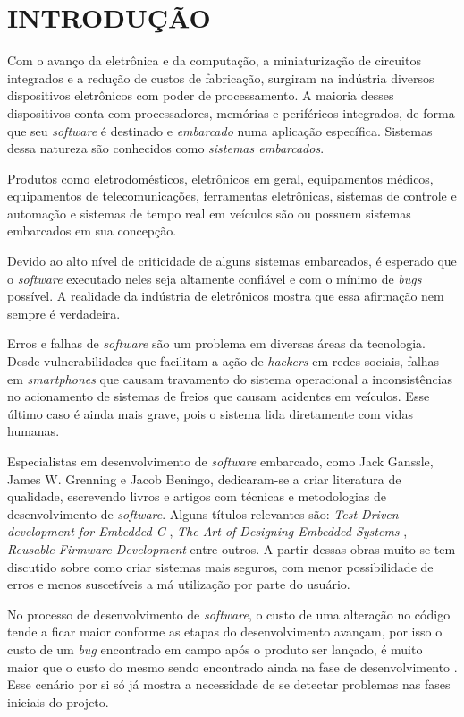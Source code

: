 \documentclass[times, twoside, watermark]{artigo}
\begin{document}
\section{INTRODUÇÃO}
Com o avanço da eletrônica e da computação, a miniaturização de circuitos integrados e a redução de custos de fabricação, 
surgiram na indústria diversos dispositivos eletrônicos com poder de processamento. 
A maioria desses dispositivos conta com processadores, memórias e periféricos integrados, 
de forma que seu \textit{software} é destinado e \textit{embarcado} numa aplicação específica. 
Sistemas dessa natureza são conhecidos como \textit{sistemas embarcados}.

Produtos como eletrodomésticos, eletrônicos em geral, equipamentos médicos, equipamentos de telecomunicações, 
ferramentas eletrônicas, sistemas de controle e automação e sistemas de tempo real em veículos são ou 
possuem sistemas embarcados em sua concepção.

Devido ao alto nível de criticidade de alguns sistemas embarcados, é esperado que o \textit{software} executado 
neles seja altamente confiável e com o mínimo de \textit{bugs} possível. A realidade da indústria de eletrônicos 
mostra que essa afirmação nem sempre é verdadeira.

Erros e falhas de \textit{software} são um problema em diversas áreas da tecnologia. 
Desde vulnerabilidades que facilitam a ação de \textit{hackers} em redes sociais, falhas em 
\textit{smartphones} que causam travamento do sistema operacional a inconsistências no 
acionamento de sistemas de freios que causam acidentes em veículos. Esse último caso é ainda mais grave, pois o sistema
lida diretamente com vidas humanas. 

Especialistas em desenvolvimento de \textit{software} embarcado, como Jack Ganssle, James W. Grenning e Jacob Beningo, 
dedicaram-se a criar literatura de qualidade, escrevendo livros e artigos com técnicas e metodologias de 
desenvolvimento de \textit{software}. Alguns títulos relevantes são: \textit{Test-Driven development for Embedded C} \cite{tddembeddedc},
\textit{The Art of Designing Embedded Systems} \cite{ganssle2008art}, \textit{Reusable Firmware Development} \cite{beningo2017reusable} entre outros. 
A partir dessas obras muito se tem discutido sobre como criar sistemas mais seguros, com menor
possibilidade de erros e menos suscetíveis a má utilização por parte do usuário.

No processo de desenvolvimento de \textit{software}, o custo de uma alteração no código tende a ficar maior conforme 
as etapas do desenvolvimento avançam, por isso o custo de um \textit{bug} encontrado em campo após o produto ser lançado, 
é muito maior que o custo do mesmo sendo encontrado ainda na fase de desenvolvimento \cite{firmwarecost}.
Esse cenário por si só já mostra a necessidade de se detectar problemas nas fases iniciais do projeto.
\end{document}

